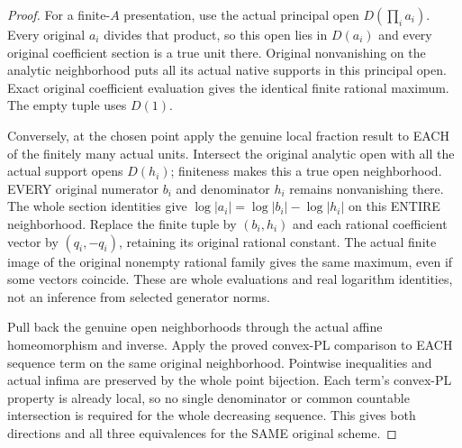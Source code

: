 \begin{proof}
For a finite-$A$ presentation, use the actual principal open
$D(\prod_i a_i)$. Every original $a_i$ divides that product, so this open lies
in $D(a_i)$ and every original coefficient section is a true unit there.
Original nonvanishing on the analytic neighborhood puts all its actual native
supports in this principal open. Exact original coefficient evaluation gives
the identical finite rational maximum. The empty tuple uses $D(1)$.

Conversely, at the chosen point apply the genuine local fraction result to
EACH of the finitely many actual units. Intersect the original analytic open
with all the actual support opens $D(h_i)$; finiteness makes this a true open
neighborhood. EVERY original numerator $b_i$ and denominator $h_i$ remains
nonvanishing there. The whole section identities give
$\log|a_i|=\log|b_i|-\log|h_i|$ on this ENTIRE neighborhood. Replace the
finite tuple by $(b_i,h_i)$ and each rational coefficient vector by
$(q_i,-q_i)$, retaining its original rational constant. The actual finite image
of the original nonempty rational family gives the same maximum, even if some
vectors coincide. These are whole evaluations and real logarithm identities,
not an inference from selected generator norms.

Pull back the genuine open neighborhoods through the actual affine
homeomorphism and inverse. Apply the proved convex-PL comparison to EACH
sequence term on the same original neighborhood. Pointwise inequalities and
actual infima are preserved by the whole point bijection. Each term's
convex-PL property is already local, so no single denominator or common
countable intersection is required for the whole decreasing sequence. This
gives both directions and all three equivalences for the SAME original scheme.
\end{proof}
